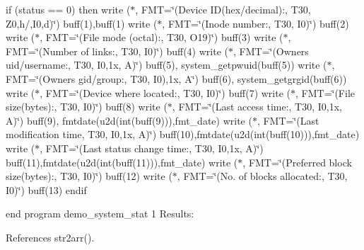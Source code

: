 if (status == 0) then write ($\ast$, F\+MT=\char`\"{}(\textquotesingle{}\+Device I\+D(hex/decimal)\+:\textquotesingle{},      T30, Z0,\textquotesingle{}h/\textquotesingle{},\+I0,\textquotesingle{}d\textquotesingle{})\char`\"{}) buff(1),buff(1) write ($\ast$, F\+MT=\char`\"{}(\textquotesingle{}\+Inode number\+:\textquotesingle{},                T30, I0)\char`\"{}) buff(2) write ($\ast$, F\+MT=\char`\"{}(\textquotesingle{}\+File mode (octal)\+:\textquotesingle{},           T30, O19)\char`\"{}) buff(3) write ($\ast$, F\+MT=\char`\"{}(\textquotesingle{}\+Number of links\+:\textquotesingle{},             T30, I0)\char`\"{}) buff(4) write ($\ast$, F\+MT=\char`\"{}(\textquotesingle{}\+Owner\textquotesingle{}\textquotesingle{}s uid/username\+:\textquotesingle{},       T30, I0,1x, A)\char`\"{}) buff(5), system\+\_\+getpwuid(buff(5)) write ($\ast$, F\+MT=\char`\"{}(\textquotesingle{}\+Owner\textquotesingle{}\textquotesingle{}s gid/group\+:\textquotesingle{},          T30, I0),1x, A\char`\"{}) buff(6), system\+\_\+getgrgid(buff(6)) write ($\ast$, F\+MT=\char`\"{}(\textquotesingle{}\+Device where located\+:\textquotesingle{},        T30, I0)\char`\"{}) buff(7) write ($\ast$, F\+MT=\char`\"{}(\textquotesingle{}\+File size(bytes)\+:\textquotesingle{},            T30, I0)\char`\"{}) buff(8) write ($\ast$, F\+MT=\char`\"{}(\textquotesingle{}\+Last access time\+:\textquotesingle{},            T30, I0,1x, A)\char`\"{}) buff(9), fmtdate(u2d(int(buff(9))),fmt\+\_\+date) write ($\ast$, F\+MT=\char`\"{}(\textquotesingle{}\+Last modification time\textquotesingle{},       T30, I0,1x, A)\char`\"{}) buff(10),fmtdate(u2d(int(buff(10))),fmt\+\_\+date) write ($\ast$, F\+MT=\char`\"{}(\textquotesingle{}\+Last status change time\+:\textquotesingle{},     T30, I0,1x, A)\char`\"{}) buff(11),fmtdate(u2d(int(buff(11))),fmt\+\_\+date) write ($\ast$, F\+MT=\char`\"{}(\textquotesingle{}\+Preferred block size(bytes)\+:\textquotesingle{}, T30, I0)\char`\"{}) buff(12) write ($\ast$, F\+MT=\char`\"{}(\textquotesingle{}\+No. of blocks allocated\+:\textquotesingle{},     T30, I0)\char`\"{}) buff(13) endif

end program demo\+\_\+system\+\_\+stat 1 Results\+: 

References str2arr().

